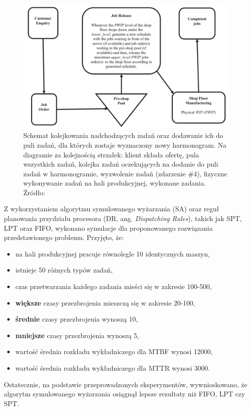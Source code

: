 \documentclass[archivemode]{mgr}
\begin{document}
\begin{figure}[!ht]
\begin{center}
\includegraphics[scale=1.0,width=16cm]{rysunki/kolejkowanie_na_serwerze.png}
\caption[Schemat kolejkowania nadchodzących zadań oraz dodawanie ich do puli zadań, dla których zostaje wyznaczony nowy harmonogram]{Schemat kolejkowania nadchodzących zadań oraz dodawanie ich do puli zadań, dla których zostaje wyznaczony nowy harmonogram. Na diagramie za kolejnością strzałek: klient składa ofertę, pula wszystkich zadań, kolejka zadań oczekujących na dodanie do puli zadań w harmonogramie, wyzwolenie zadań (zdarzenie \#4), fizyczne wykonywanie zadań na hali produkcyjnej, wykonane zadania. Źródło: \protect\cite{EDSBCR}}
\label{rys_kolejkowanie_na_serwerze}
\end{center}
\end{figure}
Z wykorzystaniem algorytmu symulowanego wyżarzania (SA) oraz reguł planowania przydziału procesora (DR, ang. \emph{Dispatching Rules}), takich jak SPT, LPT oraz FIFO, wykonano symulacje dla proponowanego rozwiązania przedstawionego problemu. Przyjęto, że:
\begin{itemize}
    \item na hali produkcyjnej pracuje równolegle 10 identycznych maszyn,
    \item istnieje 50 różnych typów zadań,
    \item czas przetwarzania każdego zadania mieści się w zakresie 100-500,
    \item \textbf{większe} czasy przezbrojenia mieszczą się w zakresie 20-100,
    \item \textbf{średnie} czasy przezbrojenia wynoszą 10,
    \item \textbf{mniejsze} czasy przezbrojenia wynoszą 5,
    \item wartość średnia rozkładu wykładniczego dla MTBF wynosi 12000,
    \item wartość średnia rozkładu wykładniczego dla MTTR wynosi 3000.
\end{itemize}
Ostatecznie, na podstawie przeprowadzonych eksperymentów, wywnioskowano, że algorytm symulowanego wyżarzania osiągnął lepsze rezultaty niż FIFO, LPT czy SPT.
%
\end{document}
